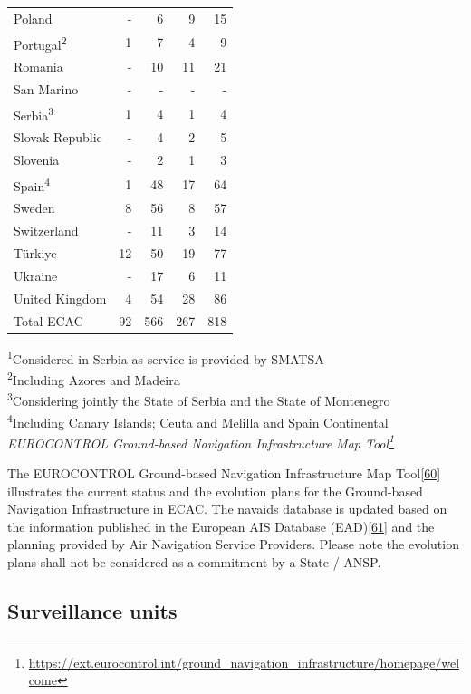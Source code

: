 \documentclass[
  11pt,
  a4paper,
]{book}
\DeclareRobustCommand{\href}[2]{#2\footnote{\url{#1}}}
\begin{document}
\begin{longtable}{lrrrr}
Poland & - & 6 & 9 & 15 \\ 
Portugal\textsuperscript{2} & 1 & 7 & 4 & 9 \\ 
Romania & - & 10 & 11 & 21 \\ 
San Marino & - & - & - & - \\ 
Serbia\textsuperscript{3} & 1 & 4 & 1 & 4 \\ 
Slovak Republic & - & 4 & 2 & 5 \\ 
Slovenia & - & 2 & 1 & 3 \\ 
Spain\textsuperscript{4} & 1 & 48 & 17 & 64 \\ 
Sweden & 8 & 56 & 8 & 57 \\ 
Switzerland & - & 11 & 3 & 14 \\ 
Türkiye & 12 & 50 & 19 & 77 \\ 
Ukraine & - & 17 & 6 & 11 \\ 
United Kingdom & 4 & 54 & 28 & 86 \\ 
Total ECAC & 92 & 566 & 267 & 818 \\ 
\bottomrule
\end{longtable}
\begin{minipage}{\linewidth}
\textsuperscript{1}Considered in Serbia as service is provided by SMATSA\\
\textsuperscript{2}Including Azores and Madeira\\
\textsuperscript{3}Considering jointly the State of Serbia and the State of Montenegro\\
\textsuperscript{4}Including Canary Islands; Ceuta and Melilla and Spain Continental\\
\emph{\href{https://ext.eurocontrol.int/ground_navigation_infrastructure/homepage/welcome}{EUROCONTROL Ground-based Navigation Infrastructure Map Tool}}\\
\end{minipage}

The EUROCONTROL Ground-based Navigation Infrastructure Map
Tool\protect\hyperlink{ref-gbnimap}{{[}60{]}} illustrates the current
status and the evolution plans for the Ground-based Navigation
Infrastructure in ECAC. The navaids database is updated based on the
information published in the European AIS Database
(EAD)\protect\hyperlink{ref-ectrlead}{{[}61{]}} and the planning
provided by Air Navigation Service Providers. Please note the evolution
plans shall not be considered as a commitment by a State / ANSP.

\hypertarget{surveillance-units}{%
\subsection{Surveillance units}\label{surveillance-units}}
\end{document}
